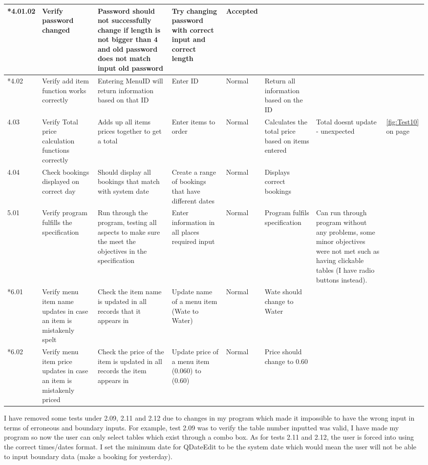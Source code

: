\begin{landscape}
\begin{center}
\begin{longtable}{|p{1.5cm}|p{2.5cm}|p{2.5cm}|p{2cm}|p{2cm}|p{2cm}|p{2cm}|p{2cm}|}
      \rowcolor{gray}   *4.01.02 & Verify password changed & Password should not successfully change if length is not bigger than 4 and old password does not match input old password   &  Try changing password with correct input and correct length&Accepted  & & \\ \hline
       \rowcolor{gray}  *4.02 & Verify add item function works correctly & Entering MenuID will return information based on that ID & Enter ID &  Normal & Return all information based on the ID  & & \\ \hline
        4.03 & Verify Total price calculation functions correctly & Adds up all items prices together to get a total & Enter items to order &  Normal & Calculates the total price based on items entered  & Total doesnt update - unexpected & \ref{fig:Test10} on page \pageref{fig:Test10} \\ \hline
	4.04 & Check bookings displayed on correct day & Should display all bookings that match with system date & Create a range of bookings that have different dates & Normal& Displays correct bookings & & \\ \hline
         5.01 & Verify program fulfills the specification & Run through the program, testing all aspects to make sure the meet the objectives in the specification & Enter information in all places required input &  Normal & Program fulfils specification  & Can run through program without any problems, some minor objectives were not met such as having clickable tables (I have radio buttons instead). & \\ \hline
	 \rowcolor{gray}*6.01 & Verify menu item name updates in case an item is mistakenly spelt & Check  the item name is updated in all records that it appears in & Update name of a menu item (Wate to Water) & Normal & Wate should change to Water & & \\ \hline
	 \rowcolor{gray}*6.02 & Verify menu item price updates in case an item is mistakenly priced & Check the price of the item is updated in all records the item appears in & Update price of a menu item (0.060) to (0.60) & Normal & Price should change to 0.60 & & \\ \hline






    \end{longtable}
\end{center}
	I have removed some tests under 2.09, 2.11 and 2.12 due to changes in my program which made it impossible to have the wrong input in terms of erroneous and boundary inputs. For example, test 2.09 was to verify the table number inputted was valid, I have made my program so now the user can only select tables which exist through a combo box. As for tests 2.11 and 2.12, the user is forced into using the correct times/dates format. I set the minimum date for QDateEdit to be the system date which would mean the user will not be able to input boundary data (make a booking for yesterday).


\end{landscape}
